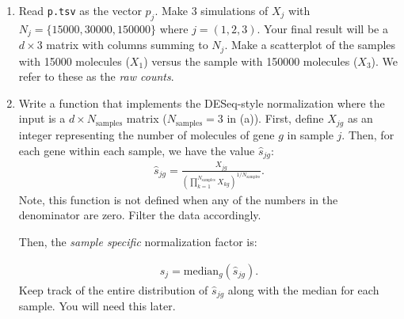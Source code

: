 \begin{enumerate}[label=(\alph*)]

  \item Read \texttt{p.tsv} as the vector $p_j$.
    Make 3 simulations of $X_j$ with $N_j = \{15000, 30000, 150000\}$ where $j = (1, 2, 3)$.
    Your final result will be a $d \times 3$ matrix with columns summing to $N_j$.
    Make a scatterplot of the samples with 15000 molecules ($X_1$) versus the sample with 150000 molecules ($X_3$).
    We refer to these as the \textit{raw counts}.
  \item Write a function that implements the DESeq-style normalization where the input is a $d \times N_{\text{samples}}$ matrix ($N_{\text{samples}} = 3$ in (a)). First, define $X_{jg}$ as an integer representing the number of molecules of gene $g$ in sample $j$. Then, for each gene within each sample, we have the value $\hat{s}_{jg}$:
    \begin{align*}
      \hat{s}_{jg} = \frac{X_{jg}}{\left(\prod_{k = 1}^{N_{\text{samples}}} X_{kg}\right)^{1 / N_{\text{samples}}}}.
    \end{align*}
    Note, this function is not defined when any of the numbers in the denominator are zero.
    Filter the data accordingly.

    Then, the \textit{sample specific} normalization factor is:

    \begin{align*}
      \hat{s}_j = \text{median}_g (\hat{s}_{jg}).
    \end{align*}
    Keep track of the entire distribution of $\hat{s}_{jg}$ along with the median for each sample. You will need this later.


\end{enumerate}
